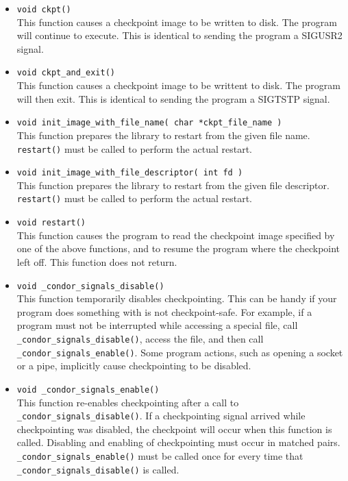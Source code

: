 \begin{itemize}

\item \verb$void ckpt()$\\
This function causes a checkpoint image to be written to disk.
The program will continue to execute.  This is identical to sending
the program a SIGUSR2 signal.

\item \verb$void ckpt_and_exit()$\\
This function causes a checkpoint image to be writtent to disk.
The program will then exit.  This is identical to sending the program
a SIGTSTP signal.

\item \verb$void init_image_with_file_name( char *ckpt_file_name )$\\
This function prepares the library to restart from the 
given file name. \verb$restart()$ must be called to perform the
actual restart.

\item \verb$void init_image_with_file_descriptor( int fd )$\\
This function prepares the library to restart from
the given file descriptor.  \verb$restart()$ must be called to
perform the actual restart.

\item \verb$void restart()$\\
This function causes the program to read the checkpoint
image specified by one of the above functions, and to resume the
program where the checkpoint left off.  This function does
not return.

\item \verb$void _condor_signals_disable()$\\
This function temporarily disables checkpointing.  This can
be handy if your program does something with is not checkpoint-safe.
For example, if a program must not be interrupted while accessing
a special file, call \verb$_condor_signals_disable()$, access the
file, and then call \verb$_condor_signals_enable()$.  Some program
actions, such as opening a socket or a pipe, implicitly cause
checkpointing to be disabled.

\item \verb$void _condor_signals_enable()$\\
This function re-enables checkpointing after a call to
\verb$_condor_signals_disable()$.  If a checkpointing signal arrived
while checkpointing was disabled, the checkpoint will occur when
this function is called.  Disabling and enabling of checkpointing
must occur in matched pairs.  \verb$_condor_signals_enable()$ must
be called once for every time that \verb$_condor_signals_disable()$
is called.


\end{itemize}
